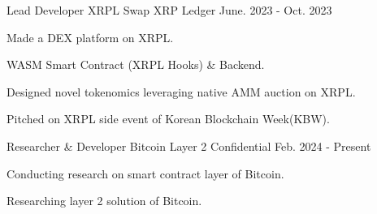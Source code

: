 


\begin{cventries}


\cventry
{Lead Developer} %
{XRPL Swap} %
{XRP Ledger} %
{June. 2023 - Oct. 2023} %
{ %
\begin{cvitems}
\item {Made a DEX platform on XRPL.}
\item {WASM Smart Contract (XRPL Hooks) \& Backend.}
\item {Designed novel tokenomics leveraging native AMM auction on XRPL.}
\item {Pitched on XRPL side event of Korean Blockchain Week(KBW).}
\end{cvitems}
}

\cventry
{Researcher \& Developer} %
{Bitcoin Layer 2} %
{Confidential} %
{Feb. 2024 - Present} %
{ %
\begin{cvitems}
\item {Conducting research on smart contract layer of Bitcoin.}
\item {Researching layer 2 solution of Bitcoin.}
\end{cvitems}
}


\end{cventries}